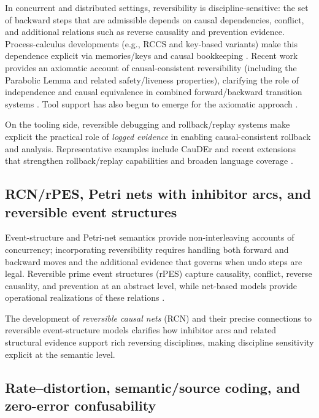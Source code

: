 \documentclass[twoside]{article}
\newcommand{\1}{\mathbf{1}}
\begin{document}
In concurrent and distributed settings, reversibility is discipline-sensitive: the set of backward steps that are admissible depends on
causal dependencies, conflict, and additional relations such as reverse causality and prevention evidence.
Process-calculus developments (e.g., RCCS and key-based variants) make this dependence explicit via memories/keys and causal bookkeeping
\cite{danos2004reversible,phillips2007reversing,ulidowski2018reversing}.
Recent work provides an axiomatic account of causal-consistent reversibility (including the Parabolic Lemma and related safety/liveness
properties), clarifying the role of independence and causal equivalence in combined forward/backward transition systems
\cite{lanese2024axiomatic,aubert2025independence}.
Tool support has also begun to emerge for the axiomatic approach \cite{arnone2025tallulah}.

On the tooling side, reversible debugging and rollback/replay systems make explicit the practical role of \emph{logged evidence} in enabling
causal-consistent rollback and analysis.
Representative examples include CauDEr and recent extensions that strengthen rollback/replay capabilities and broaden language coverage
\cite{lami2024reversibledebugging, gonzalezabril2024improvingcauder}.

\subsection{RCN/rPES, Petri nets with inhibitor arcs, and reversible event structures}

Event-structure and Petri-net semantics provide non-interleaving accounts of concurrency; incorporating reversibility requires handling
both forward and backward moves and the additional evidence that governs when undo steps are legal.
Reversible prime event structures (rPES) capture causality, conflict, reverse causality, and prevention at an abstract level, while net-based
models provide operational realizations of these relations \cite{ulidowski2018reversing}.

The development of \emph{reversible causal nets} (RCN) and their precise connections to
reversible event-structure models \cite{melgratti2024reversible,melgratti2025relating}
clarifies how inhibitor arcs and related structural evidence support rich reversing
disciplines, making discipline sensitivity explicit at the semantic level.

\subsection{Rate--distortion, semantic/source coding, and zero-error confusability}
\end{document}
